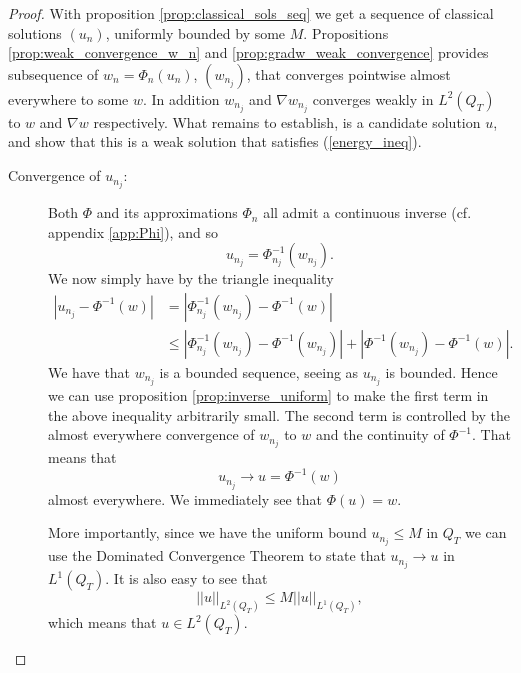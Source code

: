 \documentclass[11pt, a4paper]{article}
\begin{document}
\begin{proof}
With proposition \ref{prop:classical_sols_seq} we get a sequence of classical solutions $(u_n)$, uniformly bounded by some $M$. Propositions \ref{prop:weak_convergence_w_n} and \ref{prop:gradw_weak_convergence} provides subsequence of $w_n = \Phi_n(u_n)$, $(w_{n_j})$, that converges pointwise almost everywhere to some $w$. In addition $w_{n_j}$ and $\nabla w_{n_j}$ converges weakly in $L^2(Q_T)$ to $w$ and $\nabla w$ respectively. What remains to establish, is a candidate solution $u$, and show that this is a weak solution that satisfies (\ref{energy_ineq}).

\begin{description}
	\item[Convergence of $u_{n_j}$:] Both $\Phi$ and its approximations $\Phi_n$ all admit a continuous inverse (cf. appendix \ref{app:Phi}), and so
	\begin{equation*}
	u_{n_j} = \Phi_{n_j}^{-1}(w_{n_j}).
	\end{equation*}
	We now simply have by the triangle inequality
	\begin{align*}
	|u_{n_j} - \Phi^{-1}(w)| &= |\Phi_{n_j}^{-1}(w_{n_j}) - \Phi^{-1}(w)| \\
		&\leq |\Phi_{n_j}^{-1}(w_{n_j}) - \Phi^{-1}(w_{n_j})| + |\Phi^{-1}(w_{n_j}) - \Phi^{-1}(w)|.
	\end{align*}
	 We have that $w_{n_j}$ is a bounded sequence, seeing as $u_{n_j}$ is bounded. Hence we can use proposition \ref{prop:inverse_uniform} to make the first term in the above inequality arbitrarily small. The second term is controlled by the almost everywhere convergence of $w_{n_j}$ to $w$ and the continuity of $\Phi^{-1}$. That means that
	 \begin{equation*}
	 u_{n_j} \to u = \Phi^{-1}(w)
	 \end{equation*}
	 almost everywhere. We immediately see that $\Phi(u) = w$.
	 
	 More importantly, since we have the uniform bound $u_{n_j} \leq M$ in $Q_T$ we can use the Dominated Convergence Theorem to state that $u_{n_j} \to u$ in $L^1(Q_T)$.
	 It is also easy to see that
	 \begin{equation}
	 ||u||_{L^2(Q_T)} \leq M||u||_{L^1(Q_T)},
	 \end{equation}
	 which means that $u \in L^2(Q_T)$.


\end{description}
\end{proof}
\end{document}
